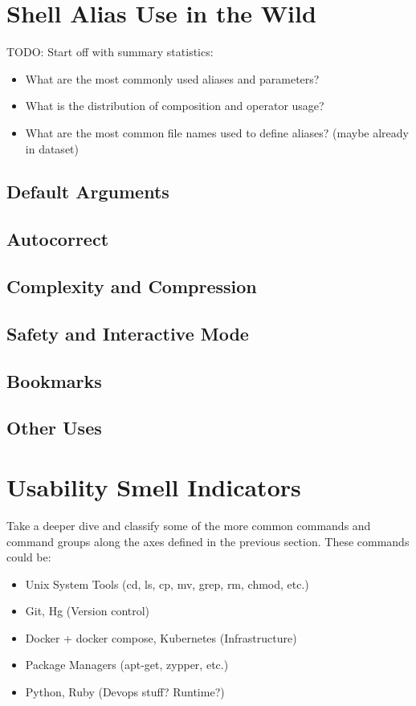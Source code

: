 \section{Shell Alias Use in the Wild}

TODO: Start off with summary statistics:
\begin{itemize}
	\item What are the most commonly used aliases and parameters?
	\item What is the distribution of composition and operator usage?
	\item What are the most common file names used to define aliases? (maybe already in dataset)
\end{itemize}

\subsection{Default Arguments}


\subsection{Autocorrect}


\subsection{Complexity and Compression}

\subsection{Safety and Interactive Mode}

\subsection{Bookmarks}

\subsection{Other Uses}


\section{Usability Smell Indicators}

Take a deeper dive and classify some of the more common commands and command groups along the axes defined in the previous section. These commands could be:
\begin{itemize}
	\item Unix System Tools (cd, ls, cp, mv, grep, rm, chmod, etc.)
	\item Git, Hg (Version control)
	\item Docker + docker compose, Kubernetes (Infrastructure)
	\item Package Managers (apt-get, zypper, etc.)
	\item Python, Ruby (Devops stuff? Runtime?)
\end{itemize}


